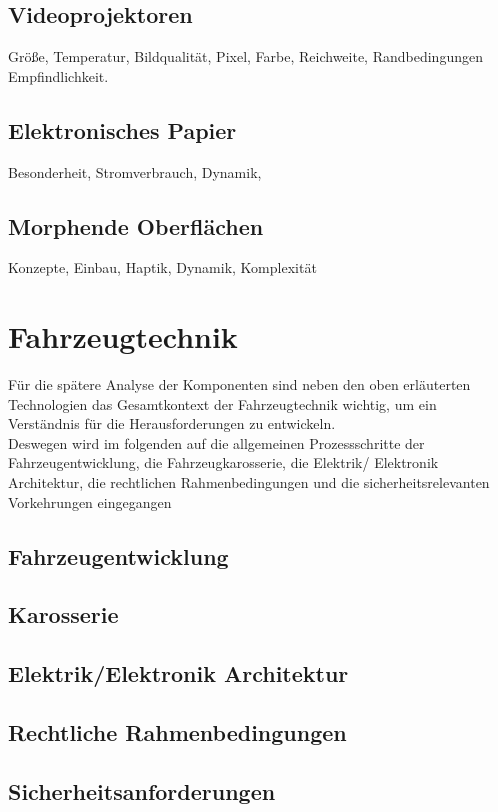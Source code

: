 \subsection{Videoprojektoren}
Größe, Temperatur, Bildqualität, Pixel, Farbe, Reichweite, Randbedingungen Empfindlichkeit.
\subsection{Elektronisches Papier}
Besonderheit, Stromverbrauch, Dynamik,
\subsection{Morphende Oberflächen}
Konzepte, Einbau, Haptik, Dynamik, Komplexität

\section{Fahrzeugtechnik}
Für die spätere Analyse der Komponenten sind neben den oben erläuterten Technologien das Gesamtkontext der Fahrzeugtechnik wichtig, um ein Verständnis für die Herausforderungen zu entwickeln.\\
Deswegen wird im folgenden auf die allgemeinen Prozessschritte der Fahrzeugentwicklung, die Fahrzeugkarosserie, die Elektrik/ Elektronik Architektur, die rechtlichen Rahmenbedingungen und die sicherheitsrelevanten Vorkehrungen eingegangen
\subsection{Fahrzeugentwicklung}
\subsection{Karosserie}
\subsection{Elektrik/Elektronik Architektur}

\subsection{Rechtliche Rahmenbedingungen}

\subsection{Sicherheitsanforderungen}